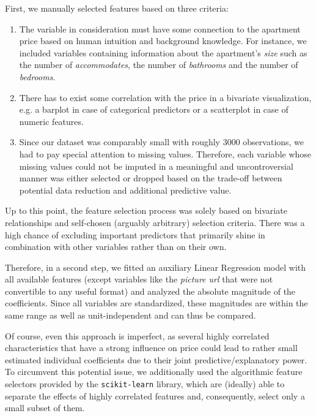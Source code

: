 First, we manually selected features based on three criteria:
\begin{enumerate}
  \item The variable in consideration must have some connection to the apartment price based on human intuition and background knowledge.
        For instance, we included variables containing information about the apartment's \emph{size} such as the number of \emph{accommodates}, the number of \emph{bathrooms} and the number of \emph{bedrooms}.
  \item There has to exist some correlation with the price in a bivariate visualization, e.g. a       barplot in case of categorical predictors or a scatterplot in case of numeric features.
  \item Since our dataset was comparably small with roughly $3000$ observations, we had to pay special attention to missing values.
        Therefore, each variable whose missing values could not be imputed in a meaningful and uncontroversial manner was either selected or dropped based on the trade-off between potential data reduction and additional predictive value.
\end{enumerate}

Up to this point, the feature selection process was solely based on bivariate relationships and self-chosen (arguably arbitrary) selection criteria.
There was a high chance of excluding important predictors that primarily shine in combination with other variables rather than on their own.

Therefore, in a second step, we fitted an auxiliary Linear Regression model with all available features (except variables like the \emph{picture url} that were not convertible to any useful format) and analyzed the absolute magnitude of the coefficients.
Since all variables are standardized, these magnitudes are within the same range as well as unit-independent and can thus be compared.

Of course, even this approach is imperfect, as several highly correlated characteristics that have a strong influence on price could lead to rather small estimated individual coefficients due to their joint predictive/explanatory power.
To circumvent this potential issue, we additionally used the algorithmic feature selectors provided by the \texttt{scikit-learn} library, which are (ideally) able to separate the effects of highly correlated features and, consequently, select only a small subset of them.

